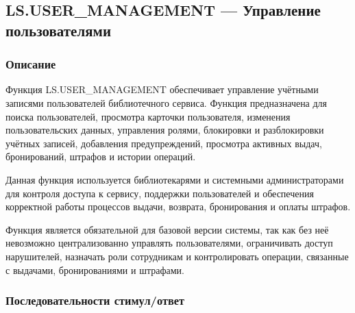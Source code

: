 \documentclass[12pt,a4paper]{article}
\begin{document}
	\subsection{LS.USER\_MANAGEMENT --- Управление пользователями}
	
	\subsubsection{Описание}
	
	Функция LS.USER\_MANAGEMENT обеспечивает управление учётными записями
	пользователей библиотечного сервиса. Функция предназначена для поиска
	пользователей, просмотра карточки пользователя, изменения пользовательских
	данных, управления ролями, блокировки и разблокировки учётных записей,
	добавления предупреждений, просмотра активных выдач, бронирований, штрафов
	и истории операций.
	
	Данная функция используется библиотекарями и системными администраторами для
	контроля доступа к сервису, поддержки пользователей и обеспечения корректной
	работы процессов выдачи, возврата, бронирования и оплаты штрафов.
	
	Функция является обязательной для базовой версии системы, так как без неё
	невозможно централизованно управлять пользователями, ограничивать доступ
	нарушителей, назначать роли сотрудникам и контролировать операции, связанные
	с выдачами, бронированиями и штрафами.
	
	\subsubsection{Последовательности стимул/ответ}
	
\end{document}
